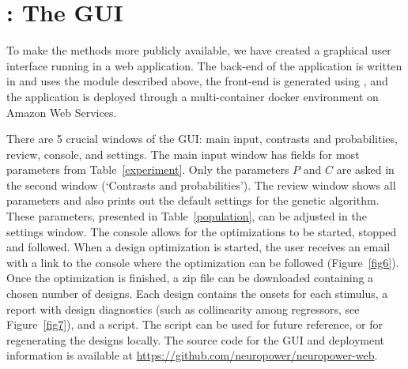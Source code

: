 \documentclass[article]{jss}
\begin{document}
\section[neurodesign: The GUI]{: The GUI}\label{sec:pkgneurodesign:-gui}

To make the methods more publicly available, we have created a
graphical user interface running in a web application.  The back-end
of the application is written in  and uses the
 module  described above, the
front-end is generated using  \citep{django}, and the
application is deployed through a multi-container docker environment
on Amazon Web Services.

There are 5 crucial windows of the GUI: main input, contrasts and
probabilities, review, console, and settings.  The main input window
has fields for most parameters from Table~\ref{experiment}.  Only the
parameters $P$ and $C$ are asked in the second window (`Contrasts and
probabilities').  The review window shows all parameters and also
prints out the default settings for the genetic algorithm.  These
parameters, presented in Table~\ref{population}, can be adjusted in
the settings window.  The console allows for the optimizations to be
started, stopped and followed.  When a design optimization is started,
the user receives an email with a link to the console where the
optimization can be followed (Figure~\ref{fig6}). Once the
optimization is finished, a zip file can be downloaded containing a
chosen number of designs.  Each design contains the onsets for each
stimulus, a report with design diagnostics (such as collinearity among
regressors, see Figure~\ref{fig7}), and a script.  The script can be
used for future reference, or for regenerating the designs locally. The
source code for the GUI and deployment information is available at
\url{https://github.com/neuropower/neuropower-web}.
\end{document}
